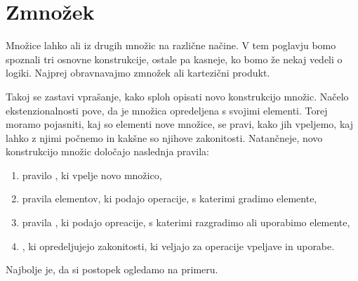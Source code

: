 




\section{Zmnožek}
\label{sec:zmnozek}

Množice lahko  ali  iz drugih množic na različne načine. V
tem poglavju bomo spoznali tri osnovne konstrukcije, ostale pa kasneje, ko bomo že nekaj
vedeli o logiki. Najprej obravnavajmo zmnožek ali kartezični produkt.

Takoj se zastavi vprašanje, kako sploh opisati novo konstrukcijo množic. Načelo
ekstenzionalnosti pove, da je množica opredeljena s svojimi elementi. Torej moramo
pojasniti, kaj so elementi nove množice, se pravi, kako jih vpeljemo, kaj lahko z njimi
počnemo in kakšne so njihove zakonitosti. Natančneje, novo konstrukcijo množic
določajo naslednja pravila:
%
\begin{enumerate}
\item pravilo , ki vpelje novo množico,
\item pravila  elementov, ki podajo operacije, s katerimi gradimo elemente,
\item pravila , ki podajo opreacije, s katerimi razgradimo ali uporabimo elemente,
\item {}, ki opredeljujejo zakonitosti, ki veljajo za operacije vpeljave in uporabe.
\end{enumerate}
%
Najbolje je, da si postopek ogledamo na primeru.

